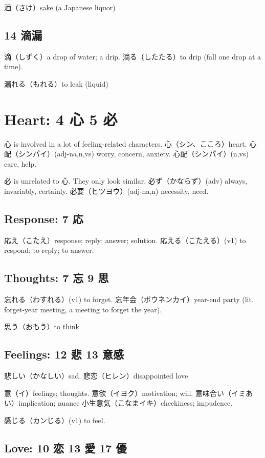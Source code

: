 酒（さけ）sake (a Japanese liquor)

\subsection{14 滴漏}

滴（しずく）a drop of water; a drip.
滴る（したたる）to drip (fall one drop at a time).

漏れる（もれる）to leak (liquid)

\section{Heart: 4 心 5 必}

心 is involved in a lot of feeling-related characters.
心（シン、こころ）heart.
心配（シンパイ）(adj-na,n,vs) worry, concern, anxiety.
心配（シンパイ）(n,vs) care, help.

必 is unrelated to 心. They only look similar.
必ず（かならず）(adv) always, invariably, certainly.
必要（ヒツヨウ）(adj-na,n) necessity, need.

\subsection{Response: 7 応}

応え（こたえ）response; reply; answer; solution.
応える（こたえる）(v1) to respond; to reply; to answer.

\subsection{Thoughts: 7 忘 9 思}

忘れる（わすれる）(v1) to forget.
忘年会（ボウネンカイ）year-end party
(lit. forget-year meeting, a meeting to forget the year).

思う（おもう）to think

\subsection{Feelings: 12 悲 13 意感}

悲しい（かなしい）sad.
悲恋（ヒレン）disappointed love

意（イ）feelings; thoughts.
意欲（イヨク）motivation; will.
意味合い（イミあい）implication; nuance
小生意気（こなまイキ）cheekiness; impudence.

感じる（カンじる）(v1) to feel.

\subsection{Love: 10 恋 13 愛 17 優}

